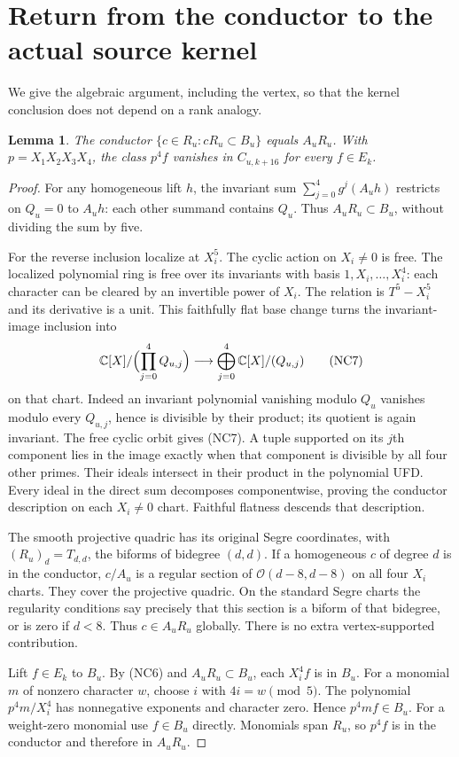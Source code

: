 \documentclass[11pt]{article}
\newtheorem{lemma}[theorem]{Lemma}
\newcommand{\C}{\mathbb C}
\begin{document}
\section{Return from the conductor to the actual source kernel}
We give the algebraic argument, including the vertex, so that the
kernel conclusion does not depend on a rank analogy.
\begin{lemma}
The conductor $\{c\in R_u:cR_u\subset B_u\}$ equals $A_uR_u$.
With $p=X_1X_2X_3X_4$, the class $p^4 f$ vanishes in $C_{u,k+16}$
for every $f\in E_k$.
\end{lemma}
\begin{proof}
For any homogeneous lift $h$, the invariant sum
$\sum_{j=0}^4g^j(A_uh)$ restricts on $Q_u=0$ to $A_uh$:
each other summand contains $Q_u$. Thus $A_uR_u\subset B_u$,
without dividing the sum by five.

For the reverse inclusion localize at $X_i^5$. The cyclic action on
$X_i\ne0$ is free. The localized polynomial ring is free over its
invariants with basis $1,X_i,\ldots,X_i^4$: each character can be
cleared by an invertible power of $X_i$. The relation is
$T^5-X_i^5$ and its derivative is a unit. This faithfully flat base
change turns the invariant-image inclusion into
\[
 \C[X]/\Bigl(\prod_{j=0}^4Q_{u,j}\Bigr)
       \longrightarrow\bigoplus_{j=0}^4\C[X]/(Q_{u,j})
 \tag{NC7}
\]
on that chart. Indeed an invariant polynomial vanishing modulo $Q_u$
vanishes modulo every $Q_{u,j}$, hence is divisible by their product;
its quotient is again invariant. The free cyclic orbit gives (NC7).
A tuple supported on its $j$th component lies in the image exactly when
that component is divisible by all four other primes. Their ideals
intersect in their product in the polynomial UFD. Every ideal in the
direct sum decomposes componentwise, proving the conductor description
on each $X_i\ne0$ chart. Faithful flatness descends that description.

The smooth projective quadric has its original Segre coordinates, with
$(R_u)_d=T_{d,d}$, the biforms of bidegree $(d,d)$.
If a homogeneous $c$ of degree $d$ is in the conductor, $c/A_u$ is
a regular section of $\mathcal O(d-8,d-8)$ on all four $X_i$ charts.
They cover the projective quadric. On the standard Segre charts the
regularity conditions say precisely that this section is a biform of
that bidegree, or is zero if $d<8$. Thus $c\in A_uR_u$ globally.
There is no extra vertex-supported contribution.

Lift $f\in E_k$ to $B_u$. By (NC6) and $A_uR_u\subset B_u$, each
$X_i^4f$ is in $B_u$. For a monomial $m$ of nonzero character $w$,
choose $i$ with $4i=w\pmod5$. The polynomial $p^4m/X_i^4$ has
nonnegative exponents and character zero. Hence $p^4mf\in B_u$.
For a weight-zero monomial use $f\in B_u$ directly. Monomials span
$R_u$, so $p^4f$ is in the conductor and therefore in $A_uR_u$.
\end{proof}
\end{document}
